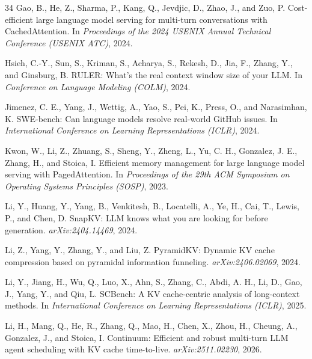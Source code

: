 \documentclass{article}
\begin{document}
\begin{thebibliography}{34}
Gao, B., He, Z., Sharma, P., Kang, Q., Jevdjic, D., Zhao, J., and
  Zuo, P.
\newblock Cost-efficient large language model serving for multi-turn
  conversations with CachedAttention.
\newblock In \emph{Proceedings of the 2024 USENIX Annual Technical
  Conference (USENIX ATC)}, 2024.

Hsieh, C.-Y., Sun, S., Kriman, S., Acharya, S., Rekesh, D., Jia, F.,
  Zhang, Y., and Ginsburg, B.
\newblock RULER: What's the real context window size of your LLM.
\newblock In \emph{Conference on Language Modeling (COLM)}, 2024.

Jimenez, C. E., Yang, J., Wettig, A., Yao, S., Pei, K., Press, O.,
  and Narasimhan, K.
\newblock SWE-bench: Can language models resolve real-world GitHub
  issues.
\newblock In \emph{International Conference on Learning
  Representations (ICLR)}, 2024.

Kwon, W., Li, Z., Zhuang, S., Sheng, Y., Zheng, L., Yu, C. H.,
  Gonzalez, J. E., Zhang, H., and Stoica, I.
\newblock Efficient memory management for large language model serving
  with PagedAttention.
\newblock In \emph{Proceedings of the 29th ACM Symposium on Operating
  Systems Principles (SOSP)}, 2023.

Li, Y., Huang, Y., Yang, B., Venkitesh, B., Locatelli, A., Ye, H.,
  Cai, T., Lewis, P., and Chen, D.
\newblock SnapKV: LLM knows what you are looking for before generation.
\newblock \emph{arXiv:2404.14469}, 2024.

Li, Z., Yang, Y., Zhang, Y., and Liu, Z.
\newblock PyramidKV: Dynamic KV cache compression based on pyramidal
  information funneling.
\newblock \emph{arXiv:2406.02069}, 2024.

Li, Y., Jiang, H., Wu, Q., Luo, X., Ahn, S., Zhang, C., Abdi, A. H.,
  Li, D., Gao, J., Yang, Y., and Qiu, L.
\newblock SCBench: A KV cache-centric analysis of long-context methods.
\newblock In \emph{International Conference on Learning Representations
  (ICLR)}, 2025.

Li, H., Mang, Q., He, R., Zhang, Q., Mao, H., Chen, X., Zhou, H.,
  Cheung, A., Gonzalez, J., and Stoica, I.
\newblock Continuum: Efficient and robust multi-turn LLM agent
  scheduling with KV cache time-to-live.
\newblock \emph{arXiv:2511.02230}, 2026.


\end{thebibliography}
\end{document}
